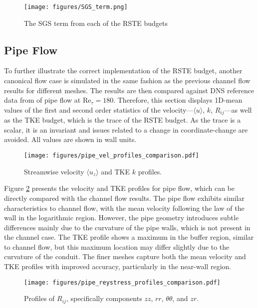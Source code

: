 \begin{figure}[ht]
    \centering
    \texttt{[image: figures/SGS\_term.png]}
    \caption{The SGS term from each of the RSTE budgets}
    \label{fig:SGS_term}
\end{figure}

\subsection{Pipe Flow}
\label{subsec:pipe_flow}

To further illustrate the correct implementation of the RSTE budget, another canonical flow case is simulated in the same fashion as the previous channel flow results for different meshes.
The results are then compared against DNS reference data from \cite{el2013direct} of pipe flow at Re$_{\tau}=180$. Therefore, this section displays 1D-mean values of the first and second order statistics of the velocity---$\langle u \rangle$, $k$, $R_{ij}$---as well as the TKE budget, which is the trace of the RSTE budget.
As the trace is a scalar, it is an invariant and issues related to a change in coordinate-change are avoided. All values are shown in wall units.

\begin{figure}[ht]
    \centering
    \texttt{[image: figures/pipe\_vel\_profiles\_comparison.pdf]}
    \caption{Streamwise velocity $\langle u_{z} \rangle$ and TKE $k$ profiles.}
    \label{fig:Fig1}
\end{figure}

Figure \ref{fig:Fig1} presents the velocity and TKE profiles for pipe flow, which can be directly compared with the channel flow results. The pipe flow exhibits similar characteristics to channel flow, with the mean velocity following the law of the wall in the logarithmic region. However, the pipe geometry introduces subtle differences mainly due to the curvature of the pipe walls, which is not present in the channel case.
The TKE profile shows a maximum in the buffer region, similar to channel flow, but this maximum location may differ slightly due to the curvature of the conduit. The finer meshes capture both the mean velocity and TKE profiles with improved accuracy, particularly in the near-wall region.

\begin{figure}[ht]
    \centering
    \texttt{[image: figures/pipe\_reystress\_profiles\_comparison.pdf]}
    \caption{Profiles of $R_{ij}$, specifically components $zz$, $rr$, $\theta\theta$, and $zr$.}
    \label{fig:Fig2}
\end{figure}

